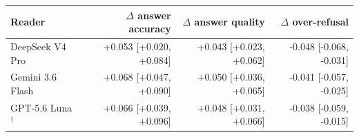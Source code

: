 \begin{tabular}{lrrr}
\toprule
Reader & $\Delta$ answer accuracy & $\Delta$ answer quality & $\Delta$ over-refusal \\
\midrule
DeepSeek V4 Pro & +0.053 [+0.020, +0.084] & +0.043 [+0.023, +0.062] & -0.048 [-0.068, -0.031] \\
Gemini 3.6 Flash & +0.068 [+0.047, +0.090] & +0.050 [+0.036, +0.065] & -0.041 [-0.057, -0.025] \\
GPT-5.6 Luna$^{\dagger}$ & +0.066 [+0.039, +0.096] & +0.048 [+0.031, +0.066] & -0.038 [-0.059, -0.015] \\
\bottomrule
\end{tabular}
